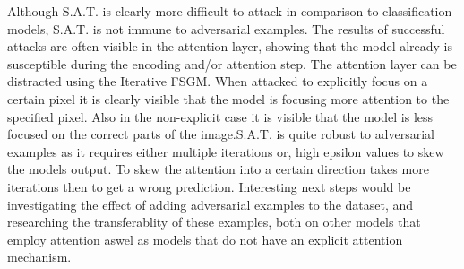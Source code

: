 Although S.A.T. is clearly more difficult to attack in comparison to classification models, S.A.T. is not immune to adversarial examples. The results of successful attacks are often visible in the attention layer, showing that the model already is susceptible during the encoding and/or attention step.
The attention layer can be distracted using the Iterative FSGM. When attacked to explicitly focus on a certain pixel it is clearly visible that the model is focusing more attention to the specified pixel. Also in the non-explicit case it is visible that the model is less focused on the correct parts of the image.S.A.T. is quite robust to adversarial examples as it requires either multiple iterations or, high epsilon values to skew the models output. To skew the attention into a certain direction takes more iterations then to get a wrong prediction. Interesting next steps would be investigating the effect of adding adversarial examples to the dataset, and researching the transferablity of these examples, both on other models that employ attention aswel as models that do not have an explicit attention mechanism.